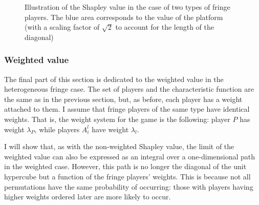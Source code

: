 \begin{figure}
    \centering
    \caption{Illustration of the Shapley value in the case of two types of fringe players. The blue area corresponds to the value of the platform (with a scaling factor of $\sqrt{2}$ to account for the length of the diagonal)}
    \label{fig:many_sided_shapley}
\end{figure}


\subsubsection{Weighted value}

The final part of this section is dedicated to the weighted value in the heterogeneous fringe case.
The set of players and the characteristic function are the same as in the previous section, but, as before, each player has a weight attached to them.
I assume that fringe players of the same type have identical weights.
That is, the weight system for the game is the following: player $P$ has weight $\lambda_P$, while players $A^l_i$ have weight $\lambda_l$.

I will show that, as with the non-weighted Shapley value, the limit of the weighted value can also be expressed as an integral over a one-dimensional path in the weighted case.
However, this path is no longer the diagonal of the unit hypercube but a function of the fringe players' weights.
This is because not all permutations have the same probability of occurring: those with players having higher weights ordered later are more likely to occur.

